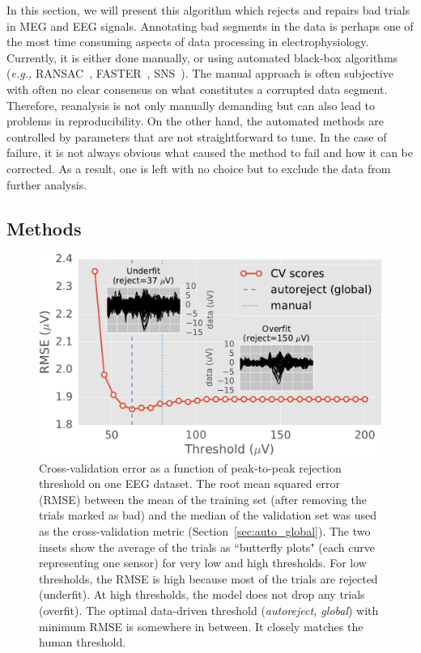In this section, we will present this algorithm which rejects and repairs bad trials in \ac{MEG} and \ac{EEG} signals. Annotating bad segments in the data is perhaps one of the most time consuming aspects of data processing in electrophysiology. Currently, it is either done manually, or using automated black-box algorithms (\textit{e.g.,} RANSAC~\citep{bigdely2015prep}, FASTER~\citep{nolan2010faster}, SNS~\citep{de2008sensor}). The manual approach is often subjective with often no clear consensus on what constitutes a corrupted data segment. Therefore, reanalysis is not only manually demanding but can also lead to problems in reproducibility. On the other hand, the automated methods are controlled by parameters that are not straightforward to tune. In the case of failure, it is not always obvious what caused the method to fail and how it can be corrected. As a result, one is left with no choice but to exclude the data from further analysis.

\subsection*{Methods}

\begin{figure}[htb]
	\centering
	\includegraphics[width=0.8\linewidth]{figures/figure1.pdf}
    \caption[]{Cross-validation error as a function of peak-to-peak rejection threshold on one EEG dataset. The root mean squared error (RMSE) between the mean of the training set (after removing the trials marked as bad) and the median of the validation set was used as the cross-validation metric (Section~\ref{sec:auto_global}). The two insets show the average of the trials as ``butterfly plots" (each curve representing one sensor) for very low and high thresholds. For low thresholds, the RMSE is high because most of the trials are rejected (underfit). At high thresholds, the model does not drop any trials (overfit). The optimal data-driven threshold (\emph{autoreject, global}) with minimum RMSE is somewhere in between. It closely matches the human threshold.}
    \label{fig:sommaire:cross_val}
\end{figure}

